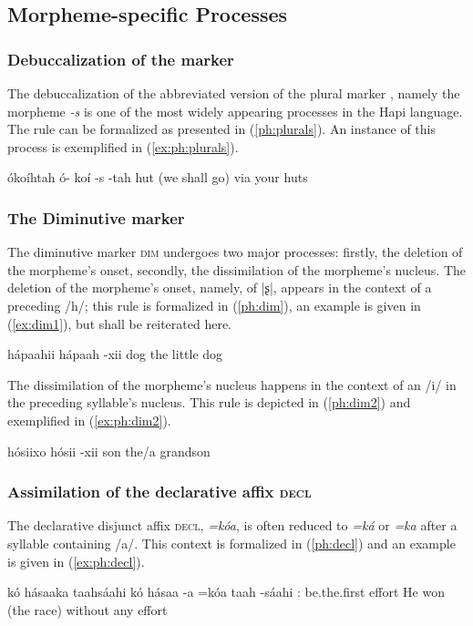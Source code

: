 \documentclass[a4paper, 12pt, oneside]{memoir}
\newcommand{\emh}[1]{\textit{#1}}
\begin{document}
\subsection{Morpheme-specific Processes}\label{morphophonomorphemespecific}
\subsubsection{Debuccalization of the marker \Pl}\label{morphophonoplural}
The debuccalization of the abbreviated version of the plural marker \Pl, namely the morpheme \emh{-s} is one of the most widely appearing processes in the Hapi language. The rule can be formalized as presented in (\ref{ph:plurals}). An instance of this process is exemplified in (\ref{ex:ph:plurals}).
\begin{examples}
\ex \label{ph:plurals} 
\ex \label{ex:ph:plurals}
\words ókoíhtah
\bits ó- koí -s -tah
\gloss {\Ssposs} hut {\Pl} {\Prl}
\tr (we shall go) via your huts
\end{examples}
\subsubsection{The Diminutive marker \Dim}\label{morphophonodim}
The diminutive marker \textsc{dim} undergoes two major processes: firstly, the deletion of the morpheme's onset, secondly, the dissimilation of the morpheme's nucleus. The deletion of the morpheme's onset, namely, of |ʂ|, appears in the context of a preceding /h/; this rule is formalized in (\ref{ph:dim}), an example is given in (\ref{ex:dim1}), but shall be reiterated here. 
\begin{examples}
\ex \label{ph:dim} 
\ex \label{ex:ph:dim}
\words hápaahii
\bits hápaah -xii
\gloss dog {\Dim}
\tr the little dog
\end{examples}
The dissimilation of the morpheme's nucleus happens in the context of an /i/ in the preceding syllable's nucleus. This rule is depicted in (\ref{ph:dim2}) and exemplified in (\ref{ex:ph:dim2}).
\begin{examples}
\ex \label{ph:dim2} 
\ex \label{ex:ph:dim2} 
\words hósiixo
\bits hósii -xii
\gloss son {\Dim} 
\tr the/a grandson
\end{examples}
\subsubsection{Assimilation of the declarative affix \textsc{decl}}\label{sdeclassim}
The declarative disjunct affix \textsc{decl}, \emh{=kóa}, is often reduced to \emh{=ká} or \emh{=ka} after a syllable containing /a/. This context is formalized in (\ref{ph:decl}) and an example is given in (\ref{ex:ph:decl}).
\begin{examples}
\ex \label{ph:decl} 
\ex \label{ex:ph:decl}
\words kó hásaaka taahsáahi
\bits kó hásaa -a =kóa taah -sáahi
\gloss {\Tsm}:{\Subject} be.the.first {\St} {\Decl} effort {\Pvt}
\tr He won (the race) without any effort
\end{examples}
\end{document}
